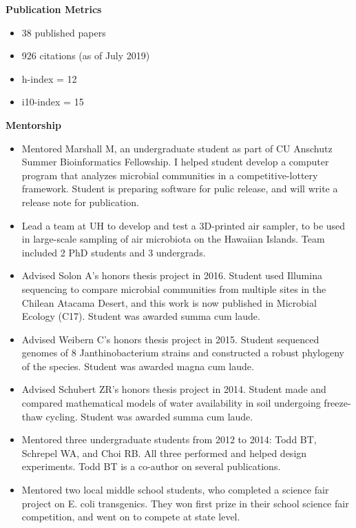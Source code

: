 \documentclass{article}
\begin{document}
\begingroup
  \setlength\bibitemsep{0pt}
  \nocite{*}
  \printbibliography[keyword=coauthor, heading=none]
\endgroup
%
\vspace{-1em}\vspace{3mm}
{\large  \textbf{Publication Metrics}}
\begin{adjustwidth}{5mm}{}
  \begin{multicols}{2}
    \begin{itemize}[noitemsep,topsep=0pt, leftmargin=0mm]
      \item 38 published papers
      \item 926 citations (as of July 2019)
      \item h-index = 12
      \item i10-index = 15
    \end{itemize}
  \end{multicols}
\end{adjustwidth}
\vspace{3mm}
{\large  \textbf{Mentorship}}
\begin{itemize}[noitemsep,topsep=0pt, leftmargin=5mm]
  \item Mentored Marshall M, an undergraduate student as part of CU Anschutz Summer Bioinformatics Fellowship. I helped student develop a computer program that analyzes microbial communities in a competitive-lottery framework. Student is preparing software for pulic release, and will write a release note for publication.
  \item Lead a team at UH to develop and test a 3D-printed air sampler, to be used in large-scale sampling of air microbiota on the Hawaiian Islands. Team included 2 PhD students and 3 undergrads.
  \item Advised Solon A’s honors thesis project in 2016. Student used Illumina sequencing to compare microbial communities from multiple sites in the Chilean Atacama Desert, and this work is now published in Microbial Ecology (C17). Student was awarded summa cum laude.
  \item Advised Weibern C’s honors thesis project in 2015. Student sequenced genomes of 8 Janthinobacterium strains and constructed a robust phylogeny of the species. Student was awarded magna cum laude.
  \item Advised Schubert ZR’s honors thesis project in 2014. Student made and compared mathematical models of water availability in soil undergoing freeze-thaw cycling. Student was awarded summa cum laude.
  \item Mentored three undergraduate students from 2012 to 2014: Todd BT, Schrepel WA, and Choi RB. All three performed and helped design experiments. Todd BT is a co-author on several publications.
  \item Mentored two local middle school students, who completed a science fair project on E. coli transgenics. They won first prize in their school science fair competition, and went on to compete at state level.
\end{itemize}
\end{document}
